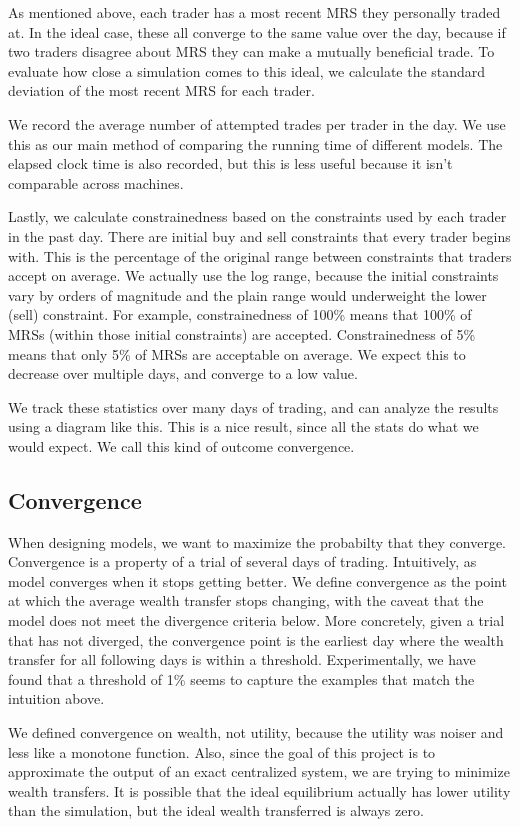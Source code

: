 \documentclass[12pt,a4paper,titlepage]{article}
\begin{document}
As mentioned above, each trader has a most recent MRS they personally traded at.
In the ideal case, these all converge to the same value over the day, because if two traders disagree about MRS they can make a mutually beneficial trade.
To evaluate how close a simulation comes to this ideal, we calculate the standard deviation of the most recent MRS for each trader.
    
We record the average number of attempted trades per trader in the day.
We use this as our main method of comparing the running time of different models.
The elapsed clock time is also recorded, but this is less useful because it isn't comparable across machines.

Lastly, we calculate constrainedness based on the constraints used by each trader in the past day.
There are initial buy and sell constraints that every trader begins with.
This is the percentage of the original range between constraints that traders accept on average.
We actually use the log range, because the initial constraints vary by orders of magnitude and the plain range would underweight the lower (sell) constraint.
For example, constrainedness of 100\% means that 100\% of MRSs (within those initial constraints) are accepted.
Constrainedness of 5\% means that only 5\% of MRSs are acceptable on average.
We expect this to decrease over multiple days, and converge to a low value.

We track these statistics over many days of trading, and can analyze the results using a diagram like this.
This is a nice result, since all the stats do what we would expect.
We call this kind of outcome convergence.

\subsection{Convergence}
When designing models, we want to maximize the probabilty that they converge.
Convergence is a property of a trial of several days of trading.
Intuitively, as model converges when it stops getting better.
We define convergence as the point at which the average wealth transfer stops changing, with the caveat that the model does not meet the divergence criteria below.
More concretely, given a trial that has not diverged, the convergence point is the earliest day where the wealth transfer for all following days is within a threshold.
Experimentally, we have found that a threshold of 1\% seems to capture the examples that match the intuition above.

We defined convergence on wealth, not utility, because the utility was noiser and less like a monotone function.
Also, since the goal of this project is to approximate the output of an exact centralized system, we are trying to minimize wealth transfers.
It is possible that the ideal equilibrium actually has lower utility than the simulation, but the ideal wealth transferred is always zero.
\end{document}
